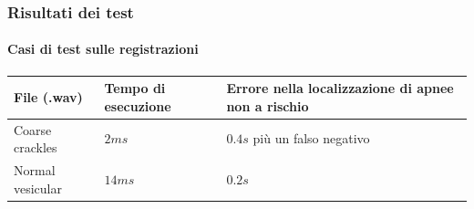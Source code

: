 \begin{frame}
  \frametitle{Risultati dei test}
  \framesubtitle{Casi di test sulle registrazioni}

% 
 \begin{table}
   \begin{tabular}{|l  p{}  p{} |}
\hline
   File (.wav)						&Tempo di esecuzione		&Errore nella localizzazione di apnee non a rischio\\
 \hline\hline
   Coarse crackles					&$2ms$			&$0.4s$	pi\`u un falso negativo		  \\
\hline
   Normal vesicular	 				&$14ms$			&$0.2s$	 \\

\end{tabular}
\end{table}
\end{frame}
